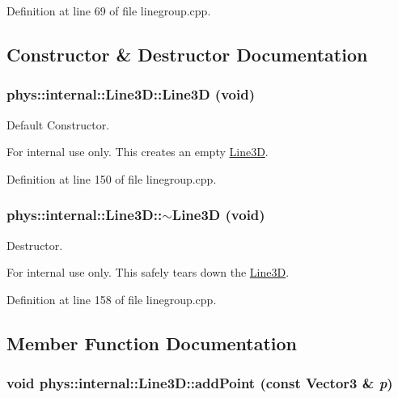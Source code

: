 Definition at line 69 of file linegroup.cpp.



\subsection{Constructor \& Destructor Documentation}
\hypertarget{classphys_1_1internal_1_1Line3D_ab22b8f5fae0bb2585b1031adfff424bd}{
\subsubsection[{Line3D}]{\setlength{\rightskip}{0pt plus 5cm}phys::internal::Line3D::Line3D (void)}}
\label{d4/db5/classphys_1_1internal_1_1Line3D_ab22b8f5fae0bb2585b1031adfff424bd}


Default Constructor. 

\begin{DoxyInternal}{For internal use only.}
This creates an empty \hyperlink{classphys_1_1internal_1_1Line3D}{Line3D}. \end{DoxyInternal}


Definition at line 150 of file linegroup.cpp.

\hypertarget{classphys_1_1internal_1_1Line3D_acddc95dd5f319d6afc68260af8bea39c}{
\subsubsection[{$\sim$Line3D}]{\setlength{\rightskip}{0pt plus 5cm}phys::internal::Line3D::$\sim$Line3D (void)}}
\label{d4/db5/classphys_1_1internal_1_1Line3D_acddc95dd5f319d6afc68260af8bea39c}


Destructor. 

\begin{DoxyInternal}{For internal use only.}
This safely tears down the \hyperlink{classphys_1_1internal_1_1Line3D}{Line3D}. \end{DoxyInternal}


Definition at line 158 of file linegroup.cpp.



\subsection{Member Function Documentation}
\hypertarget{classphys_1_1internal_1_1Line3D_aeb3b828b35b4c8ed76158285be6ddc67}{
\subsubsection[{addPoint}]{\setlength{\rightskip}{0pt plus 5cm}void phys::internal::Line3D::addPoint (const {\bf Vector3} \& {\em p})}}
\label{d4/db5/classphys_1_1internal_1_1Line3D_aeb3b828b35b4c8ed76158285be6ddc67}



